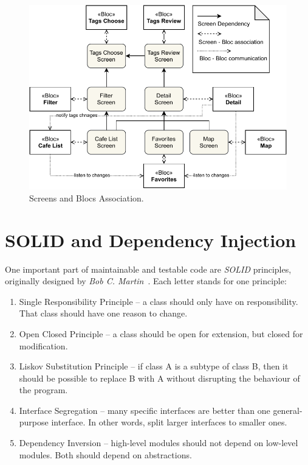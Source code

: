 \begin{figure}[h!]
    \centering
    \includegraphics[width=\textwidth]{img/implementation/bloc-screens-dependencies.pdf}
    \caption{Screens and Blocs Association.}
    \label{fig:ct-screens-bloc}
\end{figure}

\section{SOLID and Dependency Injection}
One important part of maintainable and testable code are \textit{SOLID} principles, originally designed by \textit{Bob C. Martin}~\cite{bob-martin-design-patterns}. Each letter stands for one principle: 

\begin{enumerate}
    \item Single Responsibility Principle -- a class should only have on responsibility. That class should have one reason to change.
    \item Open Closed Principle -- a class should be open for extension, but closed for modification. 
    \item Liskov Substitution Principle -- if class A is a subtype of class B, then it should be possible to replace B with A without disrupting the behaviour of the program. 
    \item Interface Segregation -- many specific interfaces are better than one general-purpose interface. In other words, split larger interfaces to smaller ones. 
    \item Dependency Inversion -- high-level modules should not depend on low-level modules. Both should depend on abstractions.
\end{enumerate}

